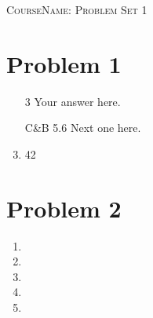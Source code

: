 \documentclass{article}
\newcommand{\coursename}{CourseName}
\newcommand{\exerciseset}{Problem Set 1}
\begin{document}
\begin{center}
\huge
\textsc{\coursename : \exerciseset}
\end{center}

\section*{Problem 1}
\begin{enumerate}
\item[3] %
Your answer here.
\item[C\&B 5.6] %
Next one here.
\item %
42
\end{enumerate}

\section*{Problem 2}
\begin{enumerate}
\item %
\item %
\item %
\item %
\item %
\end{enumerate}


\renewcommand{\mkbibnamefamily}[1]{\textsc{#1}} %
\printbibliography
\end{document}
